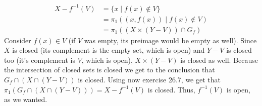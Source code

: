 \documentclass{article}
\begin{document}
    \begin{align*}
        X - f^{-1}(V) &= \{x \mid f(x) \notin V\} \\
        &= \pi_1((x, f(x)) \mid f(x) \notin V) \\
        &= \pi_1((X \times (Y - V)) \cap G_f)
    \end{align*}
    Consider $f(x) \in V$ (if $V$ was empty, its preimage would be empty as well). Since $X$ is closed (its complement is the empty set, which is open) and $Y - V$ is closed too (it's complement is $V$, which is open), $X \times (Y - V)$ is closed as well. Because the intersection of closed sets is closed we get to the conclusion that $G_f \cap (X \cap (Y - V))$ is closed. Using now exercise 26.7, we get that $\pi_1(G_f \cap (X \cap (Y - V))) = X - f^{-1}(V)$ is closed. Thus, $f^{-1}(V)$ is open, as we wanted. 
\end{document}
